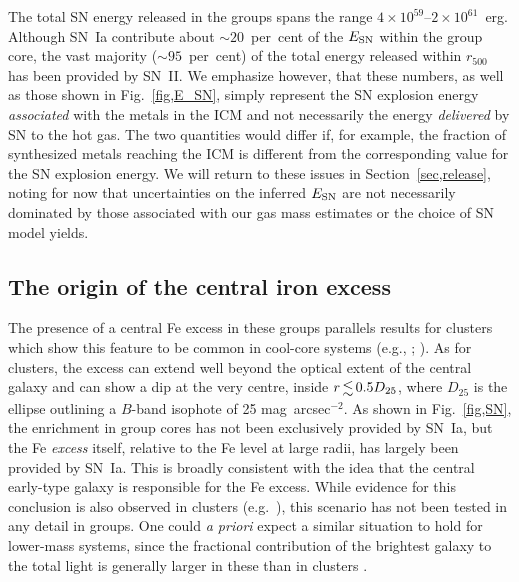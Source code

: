 \documentclass[useAMS,usenatbib]{mn2e}
\begin{document}
The total SN energy released in the groups spans the range $4\times
10^{59}$--$2\times 10^{61}$~erg.  Although SN~Ia contribute about
$\sim 20$~per~cent of the $E_{\rm SN}$ within the group core, the vast
majority ($\sim 95$~per~cent) of the total energy released within
$r_{500}$ has been provided by SN~II. We emphasize however, that these
numbers, as well as those shown in Fig.~\ref{fig,E_SN}, simply
represent the SN explosion energy {\em associated} with the metals in
the ICM and not necessarily the energy {\em delivered} by SN to the
hot gas. The two quantities would differ if, for example, the fraction
of synthesized metals reaching the ICM is different from the
corresponding value for the SN explosion energy. We will return to
these issues in Section~\ref{sec,release}, noting for now that
uncertainties on the inferred $E_{\rm SN}$ are not necessarily
dominated by those associated with our gas mass estimates or the
choice of SN model yields.





\subsection{The origin of the central iron excess}\label{sec,central}

The presence of a central Fe excess in these groups parallels results
for clusters which show this feature to be common in cool-core systems
(e.g., \citealt{fino00}; \citealt{degr04}). As for clusters, the
excess can extend well beyond the optical extent of the central galaxy
and can show a dip at the very centre, inside $r\la 0.5D_{25}$, where
$D_{25}$ is the ellipse outlining a $B$-band isophote of 25
mag~arcsec$^{-2}$. As shown in Fig.~\ref{fig,SN}, the enrichment in
group cores has not been exclusively provided by SN~Ia, but the Fe
{\em excess} itself, relative to the Fe level at large radii, has
largely been provided by SN~Ia. This is broadly consistent with the
idea that the central early-type galaxy is responsible for the Fe
excess. While evidence for this conclusion is also observed in
clusters (e.g.\ \citealt{boeh04,degr04}), this scenario has not been
tested in any detail in groups. One could {\em a priori} expect a
similar situation to hold for lower-mass systems, since the fractional
contribution of the brightest galaxy to the total light is generally
larger in these than in clusters \citep{lin04}.
\end{document}
